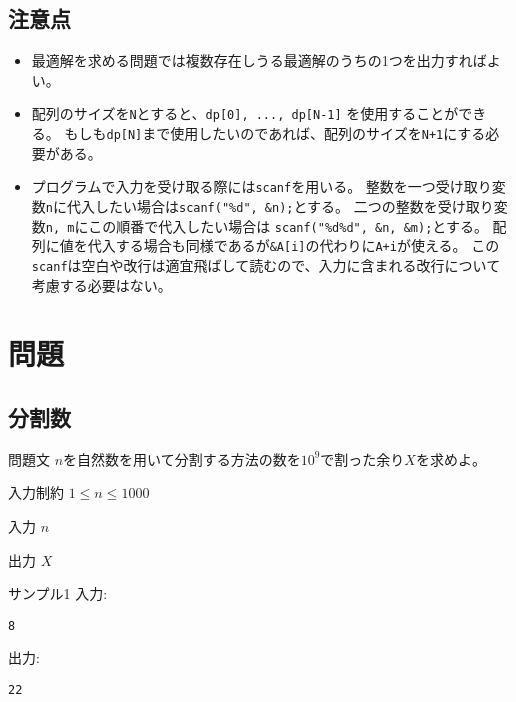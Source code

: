 \documentclass[a4paper,twoside,onecolumn,openany,article,10pt]{memoir}
\theoremstyle{remark}
\begin{document}
\subsection{注意点}
\begin{itemize}
\item 最適解を求める問題では複数存在しうる最適解のうちの1つを出力すればよい。
\item 配列のサイズを\texttt{N}とすると、\texttt{dp[0], ..., dp[N-1]} を使用することができる。
もしも\texttt{dp[N]}まで使用したいのであれば、配列のサイズを\texttt{N+1}にする必要がある。
\item プログラムで入力を受け取る際には\texttt{scanf}を用いる。
整数を一つ受け取り変数\texttt{n}に代入したい場合は\texttt{scanf("\%d", \&n);}とする。
二つの整数を受け取り変数\texttt{n, m}にこの順番で代入したい場合は
\texttt{scanf("\%d\%d", \&n, \&m);}とする。
配列に値を代入する場合も同様であるが\texttt{\&A[i]}の代わりに\texttt{A+i}が使える。
この\texttt{scanf}は空白や改行は適宜飛ばして読むので、入力に含まれる改行について考慮する必要はない。
\end{itemize}

\clearpage
\section{問題}
\subsection{分割数}
\begin{itembox}[l]{問題文}
$n$を自然数を用いて分割する方法の数を$10^9$で割った余り$X$を求めよ。
\end{itembox}

\begin{itembox}[l]{入力制約}
$1\le n\le 1000$
\end{itembox}

\begin{itembox}[l]{入力}
$n$
\end{itembox}

\begin{itembox}[l]{出力}
$X$
\end{itembox}

\begin{itembox}[l]{サンプル1}
入力:
\begin{verbatim}
8
\end{verbatim}
出力:
\begin{verbatim}
22
\end{verbatim}
\end{itembox}
\end{document}
